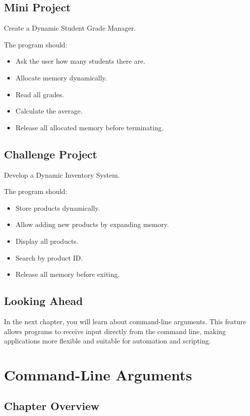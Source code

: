 \documentclass[12pt,openany]{book}
\begin{document}
\section{Mini Project}

Create a Dynamic Student Grade Manager.

The program should:

\begin{itemize}
    \item Ask the user how many students there are.
    \item Allocate memory dynamically.
    \item Read all grades.
    \item Calculate the average.
    \item Release all allocated memory before terminating.
\end{itemize}

\section{Challenge Project}

Develop a Dynamic Inventory System.

The program should:

\begin{itemize}
    \item Store products dynamically.
    \item Allow adding new products by expanding memory.
    \item Display all products.
    \item Search by product ID.
    \item Release all memory before exiting.
\end{itemize}

\section{Looking Ahead}

In the next chapter, you will learn about command-line arguments. This feature allows programs to receive input directly from the command line, making applications more flexible and suitable for automation and scripting.
\chapter{Command-Line Arguments}

\section{Chapter Overview}
\end{document}
